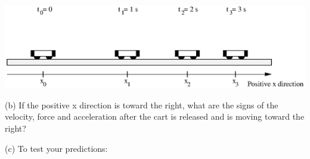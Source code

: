 \vspace{0.3cm}
{\par\centering \includegraphics{force2/force2_fig3.eps} \par}
\vspace{0.3cm}

(b) If the positive x direction is toward the right, what are the signs of the
velocity, force and acceleration after the cart is released and is moving toward
the right?
\vspace{10mm}

(c) To test your predictions: 

